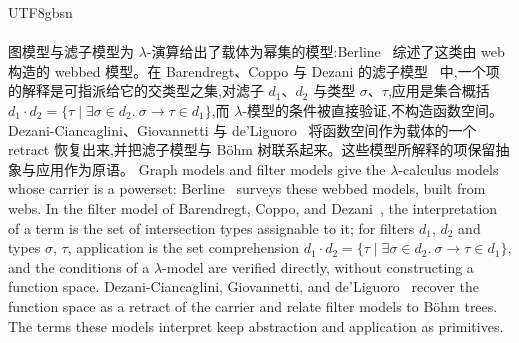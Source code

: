 \begin{CJK*}{UTF8}{gbsn}
\paragraph{}
\ifPaperChinese
图模型与滤子模型为 $\lambda$-演算给出了载体为幂集的模型:Berline~\cite{berline2000-webbed-models} 综述了这类由 web 构造的 webbed 模型。在 Barendregt、Coppo 与 Dezani 的滤子模型~\cite{barendregt1983-filter-lambda-model} 中,一个项的解释是可指派给它的交类型之集,对滤子 $d_1$、$d_2$ 与类型 $\sigma$、$\tau$,应用是集合概括 $d_1 \cdot d_2 = \{\tau \mid \exists \sigma \in d_2.\ \sigma \to \tau \in d_1\}$,而 $\lambda$-模型的条件被直接验证,不构造函数空间。Dezani-Ciancaglini、Giovannetti 与 de'Liguoro~\cite{dezani1998-intersection-types-bohm-trees} 将函数空间作为载体的一个 retract 恢复出来,并把滤子模型与 Böhm 树联系起来。这些模型所解释的项保留抽象与应用作为原语。
\else
Graph models and filter models give the $\lambda$-calculus models
whose carrier is a powerset: Berline~\cite{berline2000-webbed-models}
surveys these webbed models, built from webs.
In the filter model of Barendregt, Coppo, and
Dezani~\cite{barendregt1983-filter-lambda-model}, the interpretation
of a term is the set of intersection types assignable to it;
for filters $d_1$, $d_2$ and types $\sigma$, $\tau$, application is the
set comprehension
$d_1 \cdot d_2 = \{\tau \mid \exists \sigma \in d_2.\ \sigma \to \tau \in d_1\}$,
and the conditions of a $\lambda$-model are verified directly,
without constructing a function space.
Dezani-Ciancaglini, Giovannetti, and
de'Liguoro~\cite{dezani1998-intersection-types-bohm-trees} recover the
function space as a retract of the carrier and relate filter models
to B\"ohm trees.
The terms these models interpret keep abstraction and application as
primitives.
\fi


\end{CJK*}
